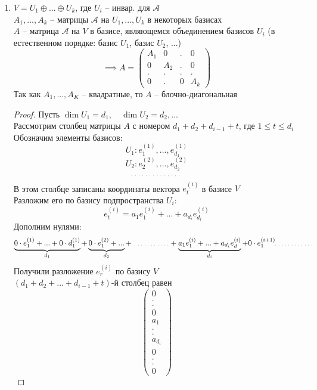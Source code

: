 \begin{theorem}
\begin{enumerate}
		\item $ V = U_1 \oplus ... \oplus U_k $, где $ U_i $ -- инвар. для $ \mathcal{A} $ \\
		$ A_1, ..., A_k $ -- матрицы $ \mathcal{A} $ на $ U_1, ..., U_k $ в некоторых базисах \\
		$ A $ -- матрица $ \mathcal{A} $ на $ V $ в базисе, являющемся объединением базисов $ U_i $ (в естественном порядке: базис $ U_1 $, базис $ U_2 $, ...)
		$$ \implies A =
		\begin{pmatrix}
			A_1 & 0 & . & 0 \\
			0 & A_2 & . & 0 \\
			. & . & . & . \\
			0 & . & 0 & A_k
		\end{pmatrix} $$
		Так как $ A_1, ..., A_K $ -- квадратные, то $ A $ -- блочно-диагональная
		\begin{proof}
			Пусть $ \dim U_1 = d_1, \quad \dim U_2 = d_2, ... $ \\
			Рассмотрим столбец матрицы $ A $ с номером $ d_1 + d_2 + d_{i - 1} + t $, где $ 1 \le t \le d_i $ \\
			Обозначим элементы базисов:
			$$ U_1 : e_1^{(1)}, ..., e_{d_1}^{(1)} $$
			$$ U_2 : e_2^{(2)}, ..., e_{d_2}^{(2)} $$
			$$ \widedots[6em] $$
			В этом столбце записаны координаты вектора $ e_t^{(i)} $ в базисе $ V $ \\
			Разложим его по базису подпространства $ U_i $:
			$$ e_t^{(i)} = a_1e_1^{(i)} + ... + a_{d_i}e_{d_i}^{(i)} $$
			Дополним нулями:
			$$ \underbrace{0 \cdot e_1^{(1)} + ... + 0 \cdot d_1^{(1)}}_{d_1} + \underbrace{0 \cdot e_1^{(2)} + ...}_{d_2} + \widedots[5em] + \underbrace{a_1e_1^{(i)} + ... + a_{d_i}e_d^{(i)}}_{d_i} + 0 \cdot e_1^{(i + 1)} \widedots[5em] $$
			Получили разложение $ e_r^{(i)} $ по базису $ V $ \\
			$ (d_1 + d_2 + ... + d_{i - 1} + t) $-й столбец равен
			$$
			\begin{pmatrix}
				0 \\
				. \\
				. \\
				0 \\
				a_1 \\
				. \\
				. \\
				a_{d_i} \\
				0 \\
				. \\
				. \\
				0
			\end{pmatrix} $$
		\end{proof}
	\end{enumerate}
\end{theorem}

